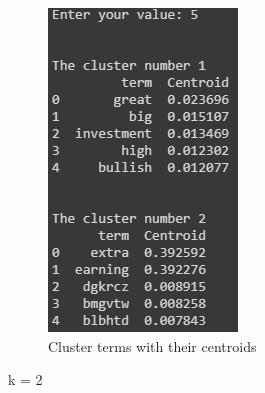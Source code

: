 \documentclass[a4paper, 12pt]{article}
\begin{document}
\begin{figure}[H]
\begin{subfigure}[b]{0.3\textwidth}
        \includegraphics[width=\textwidth]{res/k2.1.png}
        \caption{Cluster terms with their centroids}
    \end{subfigure}
		\caption{ k = 2}
    \label{fig:k2}				
\end{figure}
\end{document}
